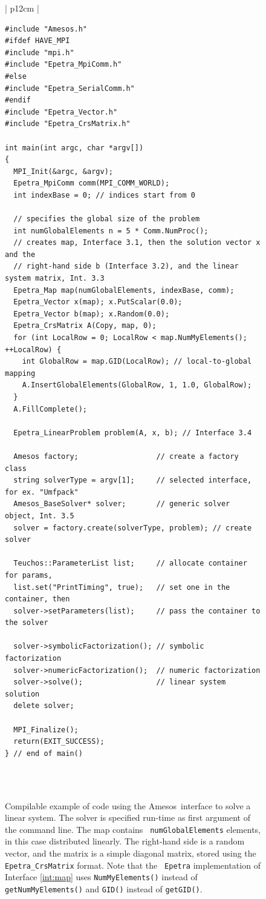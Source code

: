 \documentclass[acmtoms,acmnow]{acmtrans2m}
\newcommand{\amesos}{{\sc Amesos}}
\begin{document}
\begin{figure}
\begin{center}
\begin{tabular}{| p{12cm} | }
\hline
 \\
\begin{minipage}{12cm}
\begin{verbatim}
#include "Amesos.h"
#ifdef HAVE_MPI
#include "mpi.h"
#include "Epetra_MpiComm.h"
#else
#include "Epetra_SerialComm.h"
#endif
#include "Epetra_Vector.h"
#include "Epetra_CrsMatrix.h"

int main(int argc, char *argv[])
{
  MPI_Init(&argc, &argv);
  Epetra_MpiComm comm(MPI_COMM_WORLD);
  int indexBase = 0; // indices start from 0

  // specifies the global size of the problem
  int numGlobalElements n = 5 * Comm.NumProc();
  // creates map, Interface 3.1, then the solution vector x and the
  // right-hand side b (Interface 3.2), and the linear system matrix, Int. 3.3
  Epetra_Map map(numGlobalElements, indexBase, comm);
  Epetra_Vector x(map); x.PutScalar(0.0);
  Epetra_Vector b(map); x.Random(0.0);
  Epetra_CrsMatrix A(Copy, map, 0);
  for (int LocalRow = 0; LocalRow < map.NumMyElements(); ++LocalRow) {
    int GlobalRow = map.GID(LocalRow); // local-to-global mapping
    A.InsertGlobalElements(GlobalRow, 1, 1.0, GlobalRow);
  }
  A.FillComplete();

  Epetra_LinearProblem problem(A, x, b); // Interface 3.4

  Amesos factory;                  // create a factory class
  string solverType = argv[1];     // selected interface, for ex. "Umfpack"
  Amesos_BaseSolver* solver;       // generic solver object, Int. 3.5
  solver = factory.create(solverType, problem); // create solver

  Teuchos::ParameterList list;     // allocate container for params,
  list.set("PrintTiming", true);   // set one in the container, then
  solver->setParameters(list);     // pass the container to the solver

  solver->symbolicFactorization(); // symbolic factorization
  solver->numericFactorization();  // numeric factorization
  solver->solve();                 // linear system solution
  delete solver;

  MPI_Finalize();
  return(EXIT_SUCCESS);
} // end of main()
\end{verbatim}
\end{minipage} \\
 \\
 \hline
\end{tabular}
\caption{Compilable example of code using the \amesos\ interface
  to solve a linear system. The solver is specified run-time as first
argument of the command line. The map contains {\tt
numGlobalElements} elements, in this case distributed linearly. The
right-hand side is a random vector, and the matrix is a simple
diagonal matrix, stored using the {\tt Epetra\_CrsMatrix} format. Note that the {\tt
Epetra} implementation of Interface \ref{int:map} uses {\tt NumMyElements()}
instead of {\tt getNumMyElements()} and {\tt GID()} instead of {\tt getGID()}.}
\label{fig:example}
\end{center}
\end{figure}
\end{document}
